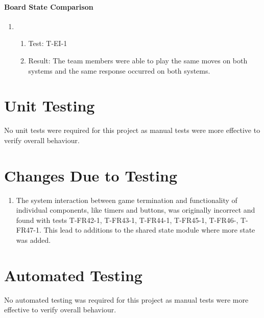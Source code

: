 \documentclass[12pt, titlepage]{article}
\begin{document}
    \paragraph{Board State Comparison}
        
        \begin{enumerate}
            \item 
                \begin{enumerate}[ ]
                    \item Test: T-EI-1
                    \item Result: The team members were able to play the same moves on both systems and the same response occurred on both systems.
                \end{enumerate}
        \end{enumerate}

\section{Unit Testing}
    No unit tests were required for this project as manual tests were more effective to verify overall behaviour.
    
\section{Changes Due to Testing}
    \begin{enumerate}
        \item The system interaction between game termination and functionality of individual components, like timers and buttons, was originally incorrect and found with tests T-FR42-1, T-FR43-1, T-FR44-1, T-FR45-1, T-FR46-, T-FR47-1. This lead to additions to the shared state module where more state was added.
    \end{enumerate}
    
\section{Automated Testing}
    No automated testing was required for this project as manual tests were more effective to verify overall behaviour.
    
\end{document}
